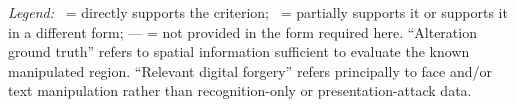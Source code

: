 \begin{landscape}
\begin{xltabular}{\linewidth}
\end{xltabular}

\vspace{0.5em}

\noindent
\footnotesize
\textit{Legend:}
\yes\ = directly supports the criterion;
\partialfit\ = partially supports it or supports it in a different form;
--- = not provided in the form required here.
``Alteration ground truth'' refers to spatial information sufficient to evaluate the
known manipulated region. ``Relevant digital forgery'' refers principally to face
and/or text manipulation rather than recognition-only or presentation-attack data.

\end{landscape}

\restoregeometry
\clearpage


